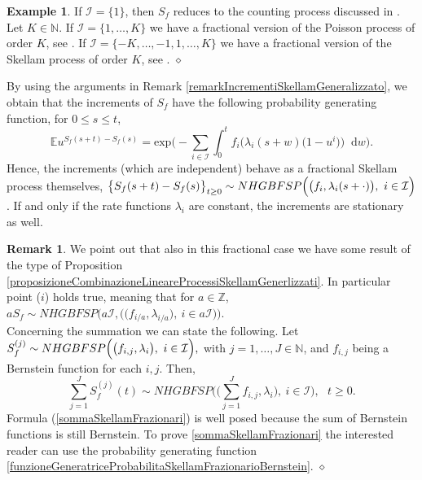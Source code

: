 \documentclass[12pt, twoside, english, headsepline]{article}
\newcommand*\dif{\mathop{}\!\mathrm{d}}  %
\theoremstyle{definition} %
\newtheorem{example}{Example}[section]
\newtheorem{remark}{Remark}[section] %
\numberwithin{equation}{section} %
\begin{document}
\begin{example}
If $\mathcal{I} = \{1\}$, then $S_f$ reduces to the counting process discussed in \cite{OT2015}.
Let $K\in\mathbb{N}$. If $\mathcal{I} = \{1,\dots,K\}$ we have a fractional version of the Poisson process of order $K$, see \cite{BS2024, DcMM2016, SMU2020}. If $\mathcal{I} = \{-K,\dots, -1,1,\dots,K\}$ we have a fractional version of the Skellam process of order $K$, see \cite{GKL2020, KK2024}.
\hfill$\diamond$
\end{example}

By using the arguments in Remark \ref{remarkIncrementiSkellamGeneralizzato}, we obtain that the increments of $S_f$ have the following probability generating function, for $0\le s\le t$,
$$\mathbb{E}u^{S_f(s+t)-S_f(s)} = \text{exp}\Biggl(-\sum_{i\in \mathcal{I}} \int_0^t f_i\Big(\lambda_i(s+w)\big(1-u^i\big)\Big)\dif w\Biggr).$$
Hence, the increments (which are independent) behave as a fractional Skellam process themselves, $\big\{S_f(s+t)-S_f(s)\big\}_{t\ge0}\sim NHGBFSP\Bigl(\big(f_i,\lambda_i(s+\cdot)\big),\ i\in\mathcal{I}\Bigr)$.
If and only if the rate functions $\lambda_i$ are constant, the increments are stationary as well.

\begin{remark}
We point out that also in this fractional case we have some result of the type of Proposition \ref{proposizioneCombinazioneLineareProcessiSkellamGenerlizzati}. In particular point ($i$) holds true, meaning that for $a\in\mathbb{Z}$,  $aS_f \sim NHGBFSP\Biggl( a\mathcal{I}, \Big( \big( f_{i/a},\lambda_{i/a}\big),\ i\in a\mathcal{I}\Big) \Biggr)$.
\\
Concerning the summation we can state the following. Let $S^{(j)}_f\sim NHGBFSP\Bigl(\big( f_{i,j},\lambda_i\big),\ i\in\mathcal{I}\Bigr),$ with $j=1,\dots,J\in\mathbb{N}$, and $f_{i,j}$ being a Bernstein function for each $i,j$. Then,
\begin{equation}\label{sommaSkellamFrazionari}
 \sum_{j=1}^J S^{(j)}_f(t)   \sim NHGBFSP\Biggl(\bigg( \sum_{j=1}^J f_{i,j},\lambda_i\bigg),\ i\in\mathcal{I}\Biggr),\ \ \ t\ge0.
\end{equation}
Formula (\ref{sommaSkellamFrazionari}) is well posed because the sum of Bernstein functions is still Bernstein. To prove \eqref{sommaSkellamFrazionari} the interested reader can use the probability generating function \eqref{funzioneGeneratriceProbabilitaSkellamFrazionarioBernstein}.
\hfill$\diamond$
\end{remark}
\end{document}
